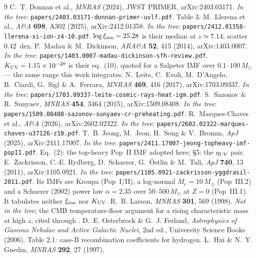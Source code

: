 \documentclass[11pt,a4paper]{article}
\begin{document}
\begin{thebibliography}{9}\small
{} C.~T. Donnan et al., \emph{MNRAS} (2024), JWST PRIMER,
  arXiv:2403.03171. \emph{In the tree}: \texttt{papers/2403.03171-donnan-primer-uvlf.pdf}. Table 3.
 M.~Llerena et al., \emph{A\&A} \textbf{698}, A302 (2025), arXiv:2412.01358.
  \emph{In the tree}: \texttt{papers/2412.01358-llerena-xi-ion-z4-10.pdf}.
  $\log\xi_{\rm ion}=25.28$ is their median at $z\simeq7.14$; scatter $0.42$~dex.
 P.~Madau \& M.~Dickinson, \emph{ARA\&A} \textbf{52}, 415 (2014),
  arXiv:1403.0007. \emph{In the tree}:
  \texttt{papers/1403.0007-madau-dickinson-sfh-review.pdf}. $K_{\rm UV}=1.15\times10^{-28}$
  is their eq.~(10), quoted for a Salpeter IMF over $0.1$--$100\,M_\odot$ --- the same
  range this work integrates.
 N.~Leite, C.~Evoli, M.~D'Angelo, B.~Ciardi, G.~Sigl \& A.~Ferrara,
  \emph{MNRAS} \textbf{469}, 416 (2017), arXiv:1703.09337. \emph{In the tree}:
  \texttt{papers/1703.09337-leite-cosmic-rays-heat-igm.pdf}.
 S.~Sazonov \& R.~Sunyaev, \emph{MNRAS} \textbf{454}, 3464 (2015),
  arXiv:1509.08408. \emph{In the tree}:
  \texttt{papers/1509.08408-sazonov-sunyaev-cr-preheating.pdf}.
 R.~Marques-Chaves et al., \emph{A\&A} (2026), arXiv:2602.02322.
  \emph{In the tree}: \texttt{papers/2602.02322-marques-chaves-u37126-z10.pdf}.
 T.~B. Jeong, M.~Jeon, H.~Song \& V.~Bromm,
  \emph{ApJ} (2025), arXiv:2411.17007. \emph{In the tree}:
  \texttt{papers/2411.17007-jeong-topheavy-imf-popII.pdf}. Eq.~(2): the
  top-heavy Pop~II IMF adopted here; \S5: the $\eta_{\rm UV}$ pair.
 E.~Zackrisson, C.-E. Rydberg, D.~Schaerer, G.~\"Ostlin
  \& M.~Tuli, \emph{ApJ} \textbf{740}, 13 (2011), arXiv:1105.0921.
  \emph{In the tree}: \texttt{papers/1105.0921-zackrisson-yggdrasil-2011.pdf}.
  Its IMFs are Kroupa (Pop~I/II), a log-normal $M_c=10\,M_\odot$ (Pop~III.2) and
  a Schaerer (2002) power law $\alpha=2.35$ over $50$--$500\,M_\odot$ at $Z=0$
  (Pop~III.1). It tabulates neither $\xi_{\rm ion}$ nor $K_{\rm UV}$.
 R.~B. Larson, \emph{MNRAS} \textbf{301}, 569 (1998).
  \emph{Not in the tree}; the CMB temperature-floor argument for a rising
  characteristic mass at high $z$, cited through \cite{jeong25}.
 D.~E. Osterbrock \& G.~J. Ferland, \emph{Astrophysics of
  Gaseous Nebulae and Active Galactic Nuclei}, 2nd ed., University Science Books
  (2006). Table 2.1: case-B recombination coefficients for hydrogen.
 L.~Hui \& N.~Y. Gnedin, \emph{MNRAS} \textbf{292}, 27 (1997),

\end{thebibliography}
\end{document}
